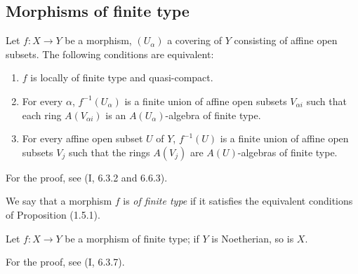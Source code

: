\subsection{Morphisms of finite type}
\label{subsection:IV.1.5}

\begin{proposition}[1.5.1]
\label{IV.1.5.1}
Let $f:X\to Y$ be a morphism, $(U_\alpha)$ a covering of $Y$ consisting of
affine open subsets. The following conditions are equivalent:
\begin{enumerate}
  \item[a)] $f$ is locally of finite type and quasi-compact.
  \item[b)] For every $\alpha$, $f^{-1}(U_\alpha)$ is a finite union of
  affine open subsets $V_{\alpha i}$ such that each ring $A(V_{\alpha i})$ is
  an $A(U_\alpha)$-algebra of finite type.
  \item[c)] For every affine open subset $U$ of $Y$, $f^{-1}(U)$ is a finite
  union of affine open subsets $V_j$ such that the rings $A(V_j)$ are
  $A(U)$-algebras of finite type.
\end{enumerate}
\end{proposition}

For the proof, see (I, 6.3.2 and 6.6.3).

\begin{definition}[1.5.2]
\label{IV.1.5.2}
We say that a morphism $f$ is \emph{of finite type} if it satisfies the
equivalent conditions of Proposition (1.5.1).
\end{definition}


\begin{proposition}[1.5.3]
\label{IV.1.5.3}
Let $f:X\to Y$ be a morphism of finite type; if $Y$ is Noetherian, so is
$X$.
\end{proposition}

For the proof, see (I, 6.3.7).

